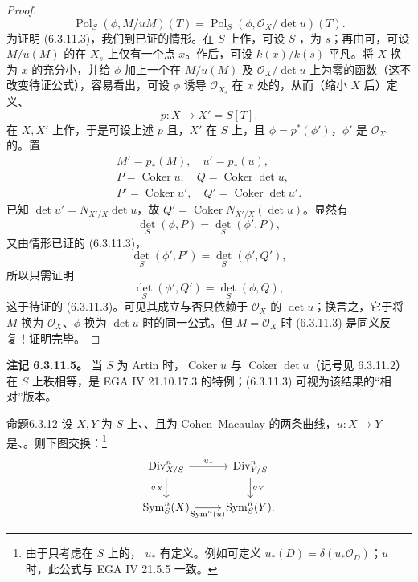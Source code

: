 \begin{proof}
\[\operatorname{Pol}_S(\phi,M/uM)(T)=\operatorname{Pol}_S(\phi,\mathcal O_X/\det u)(T).\tag{6.3.11.4}\]
为证明 (6.3.11.3)，我们到已证的情形。在 $S$ 上作，可设 $S$ ，为 $s$；再由可，可设 $M/u(M)$ 的在 $X_s$ 上仅有一个点 $x$。作后，可设 $k(x)/k(s)$ 平凡。将 $X$ 换为 $x$ 的充分小，并给 $\phi$ 加上一个在 $M/u(M)$ 及 $\mathcal O_X/\det u$ 上为零的函数（这不改变待证公式），容易看出，可设 $\phi$ 诱导 $\mathcal O_{X_s}$ 在 $x$ 处的，从而（缩小 $X$ 后）定义、
\[p:X\longrightarrow X'=S[T].\]
在 $X,X'$ 上作，于是可设上述 $p$ 且，$X'$ 在 $S$ 上，且 $\phi=p^*(\phi')$，$\phi'$ 是
$\mathcal O_{X'}$ 的。置
\[\begin{gathered}M'=p_*(M),\quad u'=p_*(u),\\P=\operatorname{Coker}u,\quad Q=\operatorname{Coker}\det u,\\P'=\operatorname{Coker}u',\quad Q'=\operatorname{Coker}\det u'.\end{gathered}\]
已知 $\det u'=N_{X'/X}\det u$，故 $Q'=\operatorname{Coker}N_{X'/X}(\det u)$。显然有
\[\det_S(\phi,P)=\det_S(\phi',P),\]
又由情形已证的 (6.3.11.3)，
\[\det_S(\phi',P')=\det_S(\phi',Q'),\]
所以只需证明
\[\det_S(\phi',Q')=\det_S(\phi,Q),\]
这于待证的 (6.3.11.3)。可见其成立与否只依赖于 $\mathcal O_X$ 的 $\det u$；换言之，它于将 $M$ 换为 $\mathcal O_X$、$\phi$ 换为 $\det u$ 时的同一公式。但 $M=\mathcal O_X$ 时 (6.3.11.3) 是同义反复！证明完毕。
\end{proof}
\textbf{注记 6.3.11.5。} 当 $S$ 为 Artin 时，$\operatorname{Coker}u$ 与 $\operatorname{Coker}\det u$（记号见 6.3.11.2）在 $S$ 上秩相等，是 EGA IV 21.10.17.3 的特例；(6.3.11.3) 可视为该结果的“相对”版本。
\begin{SGAresult}{命题}{6.3.12}
设 $X,Y$ 为 $S$ 上、、且为 Cohen--Macaulay 的两条曲线，$u:X\to Y$ 是、。则下图交换：\footnote{由于只考虑在 $S$ 上的， $u_*$ 有定义。例如可定义 $u_*(D)=\delta(u_*\mathcal O_D)$；$u$ 时，此公式与 EGA IV 21.5.5 一致。}
\[\begin{tikzcd}\operatorname{Div}_{X/S}^n\arrow[r,"u_*"]\arrow[d,"\sigma_X"']&\operatorname{Div}_{Y/S}^n\arrow[d,"\sigma_Y"]\\\operatorname{Sym}_S^n(X)\arrow[r,"\operatorname{Sym}^n(u)"']&\operatorname{Sym}_S^n(Y).\end{tikzcd}\]
\end{SGAresult}

